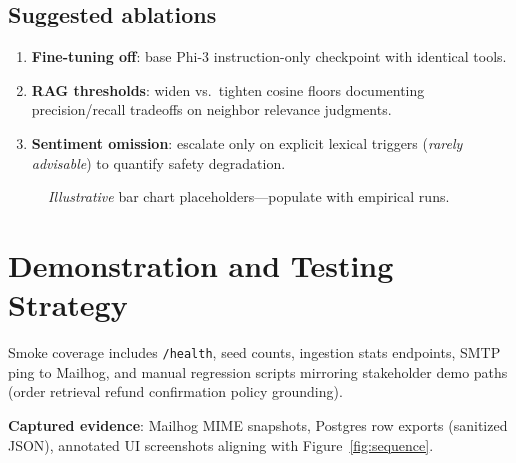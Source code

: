 \documentclass[11pt,a4paper,twoside]{report}
\begin{document}
\section{Suggested ablations}

\begin{enumerate}
\item \textbf{Fine-tuning off}: base Phi-3 instruction-only checkpoint with identical tools.
\item \textbf{RAG thresholds}: widen vs.\ tighten cosine floors documenting precision/recall tradeoffs on neighbor relevance judgments.
\item \textbf{Sentiment omission}: escalate only on explicit lexical triggers (\emph{rarely advisable}) to quantify safety degradation.
\end{enumerate}

\begin{figure}[htbp]\centering
{}\caption{\emph{Illustrative} bar chart placeholders—populate with empirical runs.}
\label{fig:metrics-bar}
\end{figure}

\chapter{Demonstration and Testing Strategy}

Smoke coverage includes \texttt{/health}, seed counts, ingestion stats endpoints, SMTP ping to Mailhog, and manual regression scripts mirroring stakeholder demo paths (order retrieval \textrightarrow{} refund confirmation \textrightarrow{} policy grounding).

\textbf{Captured evidence}: Mailhog MIME snapshots, Postgres row exports (sanitized JSON), annotated UI screenshots aligning with Figure~\ref{fig:sequence}.
\end{document}
